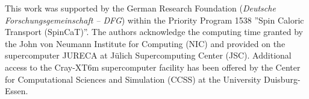 \documentclass[aps,prb,twocolumn,superscriptaddress,showpacs]{revtex4}
\begin{document}

\acknowledgments

This work was supported by the German Research Foundation 
({\em Deutsche Forschungsgemeinschaft -- DFG}) 
within the Priority Program 1538 ''Spin Caloric Transport
(SpinCaT)''. 
The authors acknowledge the computing time granted by the 
John von Neumann Institute for Computing (NIC) and provided on the 
supercomputer JURECA at J\"ulich Supercomputing Center (JSC).
Additional access to the Cray-XT6m supercomputer facility
has been offered by the Center for Computational Sciences 
and Simulation (CCSS) at the University Duisburg-Essen. 
\end{document}
